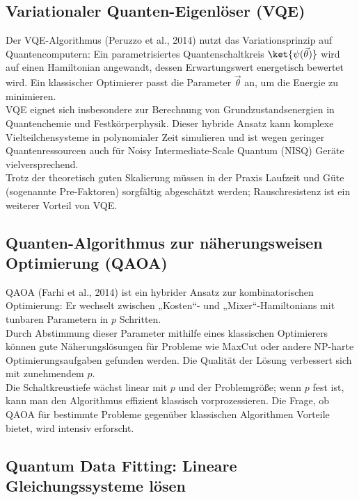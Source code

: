 \subsection{Variationaler Quanten-Eigenlöser (VQE)}

Der VQE-Algorithmus (Peruzzo et al., 2014) nutzt das Variationsprinzip auf Quantencomputern: Ein parametrisiertes Quantenschaltkreis $\ket{\psi(\vec\theta)}$ wird auf einen Hamiltonian angewandt, dessen Erwartungswert energetisch bewertet wird. Ein klassischer Optimierer passt die Parameter $\vec\theta$ an, um die Energie zu minimieren.\\
VQE eignet sich insbesondere zur Berechnung von Grundzustandsenergien in Quantenchemie und Festkörperphysik. Dieser hybride Ansatz kann komplexe Vielteilchensysteme in polynomialer Zeit simulieren und ist wegen geringer Quantenressourcen auch für Noisy Intermediate-Scale Quantum (NISQ) Geräte vielversprechend.\\
Trotz der theoretisch guten Skalierung müssen in der Praxis Laufzeit und Güte (sogenannte Pre-Faktoren) sorgfältig abgeschätzt werden; Rauschresistenz ist ein weiterer Vorteil von VQE.

\subsection{Quanten-Algorithmus zur näherungsweisen Optimierung (QAOA)}

QAOA (Farhi et al., 2014) ist ein hybrider Ansatz zur kombinatorischen Optimierung: Er wechselt zwischen „Kosten“- und „Mixer“-Hamiltonians mit tunbaren Parametern in $p$ Schritten.\\
Durch Abstimmung dieser Parameter mithilfe eines klassischen Optimierers können gute Näherungslösungen für Probleme wie MaxCut oder andere NP-harte Optimierungsaufgaben gefunden werden. Die Qualität der Lösung verbessert sich mit zunehmendem $p$.\\
Die Schaltkreustiefe wächst linear mit $p$ und der Problemgröße; wenn $p$ fest ist, kann man den Algorithmus effizient klassisch vorprozessieren. Die Frage, ob QAOA für bestimmte Probleme gegenüber klassischen Algorithmen Vorteile bietet, wird intensiv erforscht.\\

\subsection{Quantum Data Fitting: Lineare Gleichungssysteme lösen}

